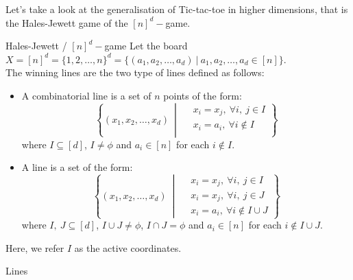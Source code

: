 \documentclass[../main.tex]{subfiles}
\begin{document}
Let's take a look at the generalisation of Tic-tac-toe in higher dimensions, that is the Hales-Jewett game of the $[n]^d-$game.

\begin{definition}[label = nd-game]{Hales-Jewett / $[n]^d-$game}
    Let the board $X = [n]^d = \{1, 2, \hdots, n\}^d = \{(a_1, a_2, \hdots, a_d) ~|~ a_1, a_2, \hdots, a_d \in [n]\}$. \\
    The winning lines are the two type of lines defined as follows:
    \begin{itemize}
        \item A combinatorial line is a set of \(n\) points of the form:
        \[\left\{(x_1, x_2, \hdots, x_d) ~\middle|~ 
        \begin{aligned}
      &x_i = x_j, ~\forall i, ~j \in I\\
      &x_i = a_i, ~\forall i \notin I\\
    \end{aligned}\right\}\]
    where $I \subseteq [d]$, $I \neq \phi$ and $a_i \in [n]$ for each $i \notin I$.
    \item A line is a set of the form:
    \[\left\{(x_1, x_2, \hdots, x_d) ~\middle|~ 
        \begin{aligned}
      &x_i = x_j, ~\forall i, ~j \in I\\
      &x_i = x_j, ~\forall i, ~j \in J\\
      &x_i = a_i, ~\forall i \notin I \cup J
    \end{aligned}\right\}\]
    where $I, ~J \subseteq [d]$, $I \cup J \neq \phi$, $I \cap J = \phi$ and $a_i \in [n]$ for each $i \notin I \cup J$.
    \end{itemize}
\end{definition}

Here, we refer $I$ as the active coordinates.

\begin{example}{Lines}
    
\end{example}
\end{document}
